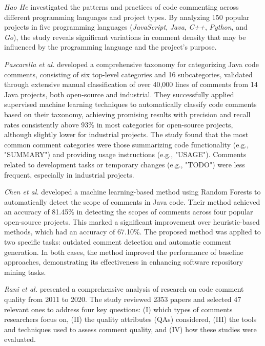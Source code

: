 \noindent \textit{Hao He} \cite{HaoHe19} investigated the patterns and practices of code commenting across different programming languages and project types. By analyzing 150 popular projects in five programming languages (\textit{JavaScript}, \textit{Java}, \textit{C++}, \textit{Python}, and \textit{Go}), the study reveals significant variations in comment density that may be influenced by the programming language and the project's purpose.

\noindent \textit{Pascarella et al.} \cite{javaCmsClassification} developed a comprehensive taxonomy for categorizing Java code comments, consisting of six top-level categories and 16 subcategories, validated through extensive manual classification of over 40,000 lines of comments from 14 Java projects, both open-source and industrial. They successfully applied supervised machine learning techniques to automatically classify code comments based on their taxonomy, achieving promising results with precision and recall rates consistently above 93\% in most categories for open-source projects, although slightly lower for industrial projects. The study found that the most common comment categories were those summarizing code functionality (e.g., "SUMMARY") and providing usage instructions (e.g., "USAGE"). Comments related to development tasks or temporary changes (e.g., "TODO") were less frequent, especially in industrial projects.

\noindent \textit{Chen et al.} \cite{CHEN201945} developed a machine learning-based method using Random Forests to automatically detect the scope of comments in Java code. Their method achieved an accuracy of 81.45\% in detecting the scopes of comments across four popular open-source projects. This marked a significant improvement over heuristic-based methods, which had an accuracy of 67.10\%. The proposed method was applied to two specific tasks: outdated comment detection and automatic comment generation. In both cases, the method improved the performance of baseline approaches, demonstrating its effectiveness in enhancing software repository mining tasks.

\noindent \textit{Rani et al.}\cite{Rani2023} presented a comprehensive analysis of research on code comment quality from 2011 to 2020. The study reviewed 2353 papers and selected 47 relevant ones to address four key questions: (I) which types of comments researchers focus on, (II) the quality attributes (QAs) considered, (III) the tools and techniques used to assess comment quality, and (IV) how these studies were evaluated.